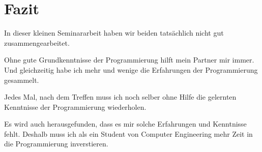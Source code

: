 %
\chapter{Fazit}
%
In  dieser kleinen Seminararbeit haben wir beiden tatsächlich nicht gut zusammengearbeitet.    
\par Ohne gute Grundkenntnisse der Programmierung hilft mein Partner mir immer. Und gleichzeitig habe ich mehr und wenige die Erfahrungen der Programmierung gesammelt.
\par Jedes Mal, nach dem Treffen muss ich noch selber ohne Hilfe die gelernten Kenntnisse der Programmierung wiederholen. 
\par Es wird auch herausgefunden, dass es mir solche Erfahrungen und Kenntnisse fehlt. Deshalb muss ich als ein Student von Computer Engineering mehr Zeit in die Programmierung inverstieren.
\AtNextBibliography{\small\itemsep0.1ex}
\printbibliography[]

